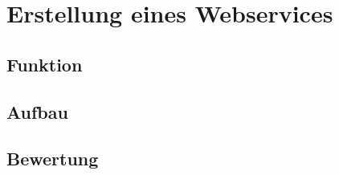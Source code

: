 \chapter{Erstellung eines Webservices} 
\label{cha:webservice}

\section{Funktion} 
\label{sec:funktion}


\section{Aufbau} 
\label{sec:aufbau}


\section{Bewertung} 
\label{sec:bewertung}



